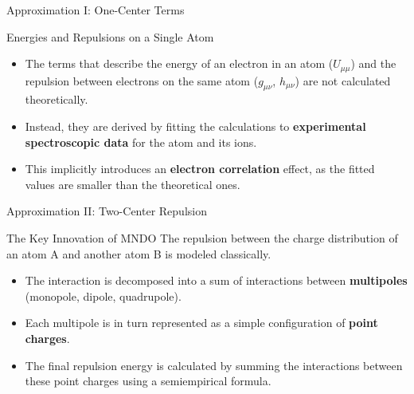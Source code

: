\begin{frame}{Approximation I: One-Center Terms}
    \begin{block}{Energies and Repulsions on a Single Atom}
        \begin{itemize}
            \item The terms that describe the energy of an electron in an atom ($U_{\mu\mu}$) and the repulsion between electrons on the same atom ($g_{\mu\nu}$, $h_{\mu\nu}$) are not calculated theoretically.
            \pause
            \bigskip
            \item Instead, they are derived by fitting the calculations to \textbf{experimental spectroscopic data} for the atom and its ions.
            \pause
            \bigskip
            \item This implicitly introduces an \textbf{electron correlation} effect, as the fitted values are smaller than the theoretical ones.
        \end{itemize}
    \end{block}
\end{frame}



\begin{frame}{Approximation II: Two-Center Repulsion}
    \begin{alertblock}{The Key Innovation of MNDO}
        The repulsion between the charge distribution of an atom A and another atom B is modeled classically.
    \end{alertblock}
    \pause
    
    \begin{itemize}
        \item The interaction is decomposed into a sum of interactions between \textbf{multipoles} (monopole, dipole, quadrupole).
        \pause
        \bigskip
        \item Each multipole is in turn represented as a simple configuration of \textbf{point charges}.
        \pause
        \bigskip
        \item The final repulsion energy is calculated by summing the interactions between these point charges using a semiempirical formula.
    \end{itemize}
\end{frame}



